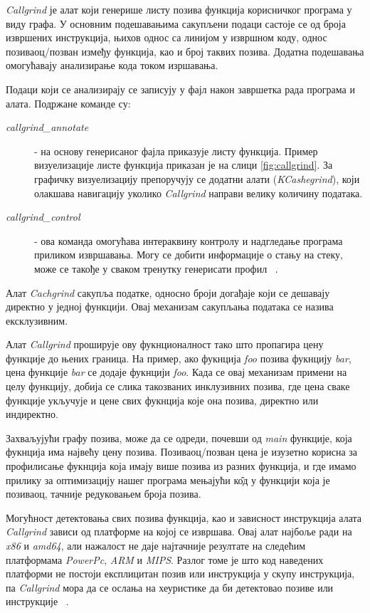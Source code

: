 \documentclass[12pt,oneside]{memoir}
\begin{document}
\indent \textit{Callgrind} је алат који генерише листу позива функција корисничког програма у виду графа. У основним подешавањима сакупљени подаци састоје се од броја извршених инструкција, њихов однос са линијом у извршном коду, однос позиваоц/позван између функција, као и број таквих позива. Додатна подешавања омогућавају анализирање кода током изршавања. 

\indent Подаци који се анализирају се записују у фајл након завршетка рада програма и алата. Подржане команде су:

\begin{description}
	\item[\textit{callgrind\_annotate}] - на основу генерисаног фајла приказује листу функција. Пример визуелизације листе функција приказан је на слици \ref{fig:callgrind}. За графичку визуелизацију препоручују се додатни алати (\textit{KCashegrind}), који олакшава навигацију уколико \textit{Callgrind} направи велику количину података.
	\item[\textit{callgrind\_control}] - ова команда омогућава интераквину контролу и надгледање програма приликом извршавања. Могу се добити информације о стању на стеку, може се такође у сваком тренутку генерисати профил ~\cite{callgrindRef}. 
\end{description}


\indent Алат \textit{Cachgrind} сакупља податке, односно броји догађаје који се дешавају директно у једној функцији. Овај механизам сакупљања података се назива ексклузивним.

\indent Алат \textit{Callgrind} проширује ову фукнционалност тако што пропагира цену функције до њених граница. На пример, ако фукнција \textit{foo} позива фукнцију \textit{bar}, цена функције \textit{bar} се додаје фукнцији \textit{foo}. Када се овај механизам примени на целу функцију, добија се слика такозваних инклузивних позива, где цена сваке функције укључује и цене свих фукнција које она позива, директно или индиректно.

\indent Захваљујући графу позива, може да се одреди, почевши од \textit{main} функције, која фукнција има највећу цену позива. Позиваоц/позван цена је изузетно корисна за профилисање фукнција која имају више позива из разних функција, и где имамо прилику за оптимизацију нашег програма мењајући к\^{о}д у функцији која је позиваоц, тачније редуковањем броја позива.

\indent Могућност детектовања свих позива функција, као и зависност инструкција алата  \textit{Callgrind} зависи од платформе на којој се извршава. Овај алат најбоље ради на \textit{x86} и \textit{amd64}, али нажалост не даје најтачније резултате на следећим платформама \textit{PowerPc}, \textit{ARM} и \textit{MIPS}. Разлог томе је што код наведених платформи не постоји експлицитан позив или инструкција у скупу инструкција, па  \textit{Callgrind} мора да се ослања на хеуристике да би детектовао позиве или инструкције ~\cite{callgrindRef}.
\end{document}
